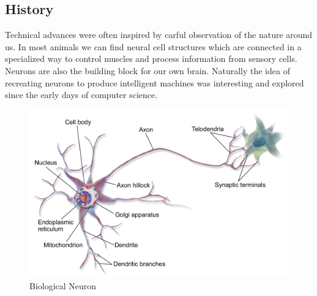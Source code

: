 \subsection{History} \label{ssec:ANNHistory}
Technical advances were often inspired by carful observation of the nature around us. In most animals we can find neural cell structures which are connected in a specialized way to control muscles and process information from sensory cells. Neurons are also the building block for our own brain. Naturally the idea of recreating neurons to produce intelligent machines was interesting and explored since the early days of computer science. 

\begin{figure}[ht]
    
  \begin{center}
      \includegraphics[clip, width=0.75\columnwidth]{figures/deeplearning/neuron.png}
  \end{center}
  
  \caption[Biological Neuron]{Biological Neuron\footnotemark}
  \label{fig:biological_neuron}
\end{figure}


